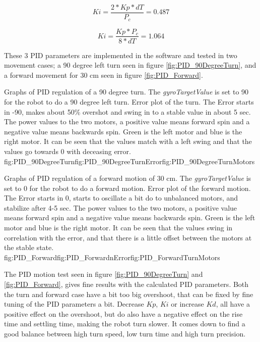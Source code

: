 $$ Ki = \frac{2*Kp*dT}{P_c} = 0.487 $$

$$ Ki = \frac{Kp*P_c}{8*dT} = 1.064 $$

These 3 PID parameters are implemented in the software and tested in two movement cases; a 90 degree left turn seen in figure \ref{fig:PID_90DegreeTurn}, and a forward movement for 30 cm seen in figure \ref{fig:PID_Forward}.


{Graphs of PID regulation of a 90 degree turn. The \emph{gyroTargetValue} is set to 90 for the robot to do a 90 degree left turn.}
{Error plot of the turn. The Error starts in -90, makes about 50\% overshot and swing in to a stable value in about 5 sec.}
{The power values to the two motors, a positive value means forward spin and a negative value means backwards spin. Green is the left motor and blue is the right motor. It can be seen that the values match with a left swing and that the values go towards 0 with deceasing error.}
{fig:PID_90DegreeTurn}{fig:PID_90DegreeTurnError}{fig:PID_90DegreeTurnMotors}

{Graphs of PID regulation of a forward motion of 30 cm. The \emph{gyroTargetValue} is set to 0 for the robot to do a forward motion.}
{Error plot of the forward motion. The Error starts in 0, starts to oscillate a bit do to unbalanced motors, and stabilize after 4-5 sec.}
{The power values to the two motors, a positive value means forward spin and a negative value means backwards spin. Green is the left motor and blue is the right motor. It can be seen that the values swing in correlation with the error, and that there is a little offset between the motors at the stable state.}
{fig:PID_Forward}{fig:PID_ForwardnError}{fig:PID_ForwardTurnMotors}

\FloatBarrier

The PID motion test seen in figure \ref{fig:PID_90DegreeTurn} and \ref{fig:PID_Forward}, gives fine results with the calculated PID parameters.
Both the turn and forward case have a bit too big overshoot, that can be fixed by fine tuning of the PID parameters a bit.
Decrease \emph{$Kp$}, \emph{$Ki$} or increase \emph{$Kd$}, all have a positive effect on the overshoot, but do also have a negative effect on the rise time and settling time, making the robot turn slower.
It comes down to find a good balance between high turn speed, low turn time and high turn precision.

\pagebreak